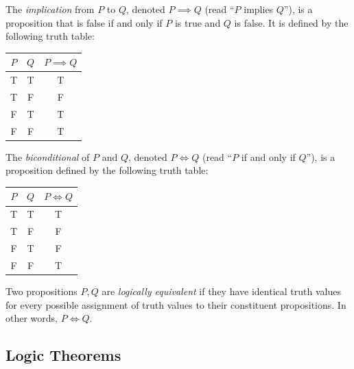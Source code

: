 \documentclass[../ium.tex]{subfiles}
\begin{document}
\begin{definition}
\begin{shaded*}
The \textit{implication} from $P$ to $Q$, denoted $P \implies Q$ (read ``$P$ implies $Q$''), is a proposition that is false if and only if $P$ is true and $Q$ is false. It is defined by the following truth table:
\begin{center}
\begin{tabular}{cc|c}
$P$ & $Q$ & $P \implies Q$ \\
\hline
T & T & T \\
T & F & F \\
F & T & T \\
F & F & T
\end{tabular}
\end{center}
\end{shaded*}
\end{definition}

\begin{definition}
\begin{shaded*}
The \textit{biconditional} of $P$ and $Q$, denoted $P \iff Q$ (read ``$P$ if and only if $Q$''), is a proposition defined by the following truth table:
\begin{center}
\begin{tabular}{cc|c}
$P$ & $Q$ & $P \iff Q$ \\
\hline
T & T & T \\
T & F & F \\
F & T & F \\
F & F & T
\end{tabular}
\end{center}
\end{shaded*}
\end{definition}

\begin{definition}
\begin{shaded*}
Two propositions $P,Q$ are \textit{logically equivalent} if they have identical truth values for every possible assignment of truth values to their constituent propositions. In other words, $P\iff Q$.
\end{shaded*}
\end{definition}

\subsection{Logic Theorems}
\end{document}

